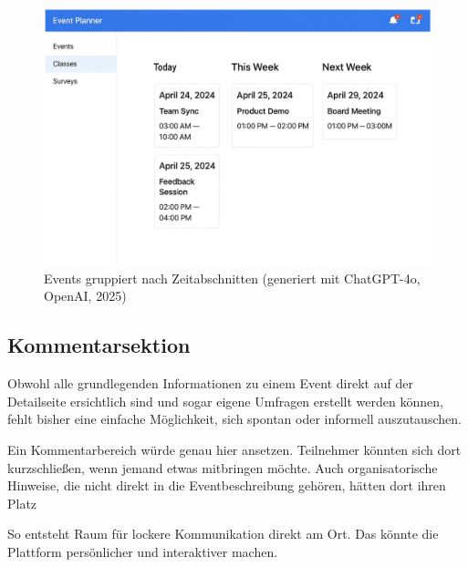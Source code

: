 \documentclass[a4paper,12pt]{article}
\begin{document}
\begin{figure}[H]
    \centering
    \includegraphics[width=1\textwidth]{Abbildungen/gruppierte_events.png}
    \caption{Events gruppiert nach Zeitabschnitten (generiert mit ChatGPT-4o, OpenAI, 2025)}
    \label{fig:gruppierte_events}
\end{figure}

\newpage


\subsection{Kommentarsektion}

Obwohl alle grundlegenden Informationen zu einem Event direkt auf der Detailseite ersichtlich sind und sogar eigene Umfragen erstellt werden können, fehlt bisher eine einfache Möglichkeit, sich spontan oder informell auszutauschen.

Ein Kommentarbereich würde genau hier ansetzen. Teilnehmer könnten sich dort kurzschließen, wenn jemand etwas mitbringen möchte. Auch organisatorische Hinweise, die nicht direkt in die Eventbeschreibung gehören, hätten dort ihren Platz

So entsteht Raum für lockere Kommunikation direkt am Ort. Das könnte die Plattform persönlicher und interaktiver machen.
\end{document}
